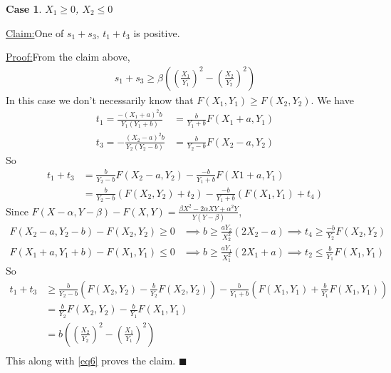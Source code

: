 \documentclass{article}
\theoremstyle{case}
\newtheorem{case}{Case}
\newenvironment{claim}[1]{\par\noindent\underline{Claim:}\space#1}{}
\newenvironment{claimproof}[1]{\par\noindent\underline{Proof:}\space#1}{\hfill $\blacksquare$}
\begin{document}
\begin{case}
$X_1 \geq 0$, $X_2 \leq 0$
\end{case}
\begin{claim}
One of $s_1 + s_3$,  $t_1 + t_3$ is positive.
\end{claim}
\begin{claimproof}
From the claim above, 
\begin{align} \label{eq6}
s_1 + s_3 \geq \beta \left( \left( \frac{X_1}{Y_1}\right)^2 - \left( \frac{X_2}{Y_2}\right)^2 \right)
\end{align}
In this case we don't necessarily know that $F(X_1, Y_1) \geq F(X_2, Y_2)$. We have
\begin{align*}
t_1 = \frac{-\left( X_1 + a \right)^2b }{Y_1\left( Y_1 + b\right)} & = \frac{b}{Y_1+b}F(X_1+a, Y_1) \\
t_3 = -\frac{\left( X_2 - a \right)^2 b }{Y_2\left( Y_2-b\right) } & = \frac{b}{Y_2 -b}F(X_2-a, Y_2)
\end{align*}
So
\begin{align*}
t_1 + t_3 & = \frac{b}{Y_2-b}F(X_2 - a,Y_2) - \frac{-b}{Y_1 + b}F(X1 + a, Y_1) \\
& = \frac{b}{Y_2-b}\left( F(X_2, Y_2) + t_2\right) - \frac{-b}{Y_1 + b}\left( F(X_1, Y_1) + t_4\right)
\end{align*}
Since $F(X - \alpha, Y - \beta) - F(X, Y) = \frac{\beta X^2 - 2\alpha XY + \alpha^2 Y}{Y\left( Y-\beta\right)}$, 
\begin{align*}
F(X_2 - a, Y_2 - b) - F(X_2, Y_2) \geq 0 & \implies b \geq \frac{a Y_2}{X_2^2}\left( 2X_2 - a \right) \implies t_4 \geq \frac{-b}{Y_2}F(X_2, Y_2) \\
F(X_1+a, Y_1+b) - F(X_1, Y_1) \leq 0 & \implies b \geq \frac{aY_1}{X_1^2}\left( 2X_1 + a \right) \implies t_2 \leq \frac{b}{Y_1}F(X_1, Y_1)
\end{align*}
So 
\begin{align*}
t_1 + t_3 & \geq \frac{b}{Y_2 - b}\left( F(X_2, Y_2) - \frac{b}{Y_2}F(X_2, Y_2)\right) - \frac{b}{Y_1+b}\left( F(X_1, Y_1) + \frac{b}{Y_1}F(X_1, Y_1)\right) \\
& = \frac{b}{Y_2}F(X_2, Y_2) - \frac{b}{Y_1}F(X_1, Y_1) \\
& = b \left( \left( \frac{X_2}{Y_2}\right)^2 - \left( \frac{X_1}{Y_1}\right)^2 \right) \\
\end{align*}
This along with \ref{eq6} proves the claim.
\end{claimproof}
\end{document}
